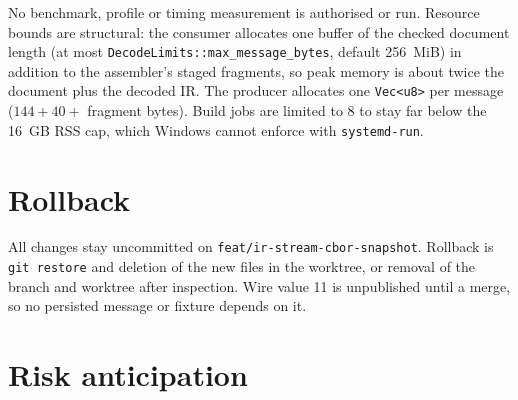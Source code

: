 \documentclass[11pt,a4paper]{article}
\begin{document}
No benchmark, profile or timing measurement is authorised or run. Resource bounds are structural: the consumer
allocates one buffer of the checked document length (at most \texttt{DecodeLimits::max\_message\_bytes}, default
256~MiB) in addition to the assembler's staged fragments, so peak memory is about twice the document plus the decoded
IR. The producer allocates one \texttt{Vec<u8>} per message ($144 + 40 +$ fragment bytes). Build jobs are limited to 8
to stay far below the 16~GB RSS cap, which Windows cannot enforce with \texttt{systemd-run}.

\section{Rollback}

All changes stay uncommitted on \texttt{feat/ir-stream-cbor-snapshot}. Rollback is \texttt{git restore} and deletion of
the new files in the worktree, or removal of the branch and worktree after inspection. Wire value 11 is unpublished
until a merge, so no persisted message or fixture depends on it.

\section{Risk anticipation}
\end{document}
